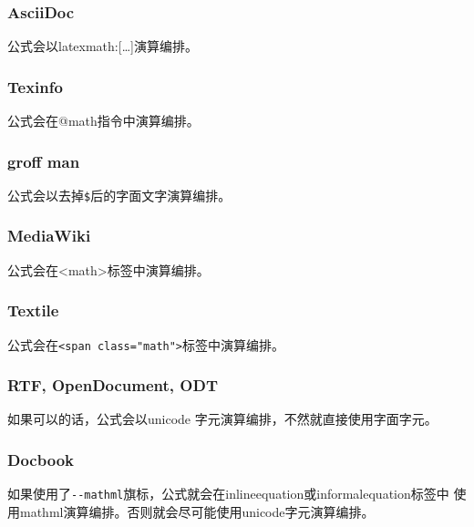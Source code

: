 \documentclass[cn]{elegantbook}
\newcommand{\passthrough}[1]{#1}
\begin{document}
\hypertarget{asciidoc}{%
\subsubsection{AsciiDoc}\label{asciidoc}}

公式会以latexmath:{[}\ldots{]}演算编排。

\hypertarget{texinfo}{%
\subsubsection{Texinfo}\label{texinfo}}

公式会在@math指令中演算编排。

\hypertarget{groff-man}{%
\subsubsection{groff man}\label{groff-man}}

公式会以去掉\passthrough{\lstinline!$!}后的字面文字演算编排。

\hypertarget{mediawiki}{%
\subsubsection{MediaWiki}\label{mediawiki}}

公式会在\textless math\textgreater 标签中演算编排。

\hypertarget{textile}{%
\subsubsection{Textile}\label{textile}}

公式会在\passthrough{\lstinline!<span class="math">!}标签中演算编排。

\hypertarget{rtf-opendocument-odt}{%
\subsubsection{RTF, OpenDocument, ODT}\label{rtf-opendocument-odt}}

如果可以的话，公式会以unicode 字元演算编排，不然就直接使用字面字元。

\hypertarget{docbook}{%
\subsubsection{Docbook}\label{docbook}}

如果使用了\passthrough{\lstinline!--mathml!}旗标，公式就会在inlineequation或informalequation标签中
使用mathml演算编排。否则就会尽可能使用unicode字元演算编排。
\end{document}
